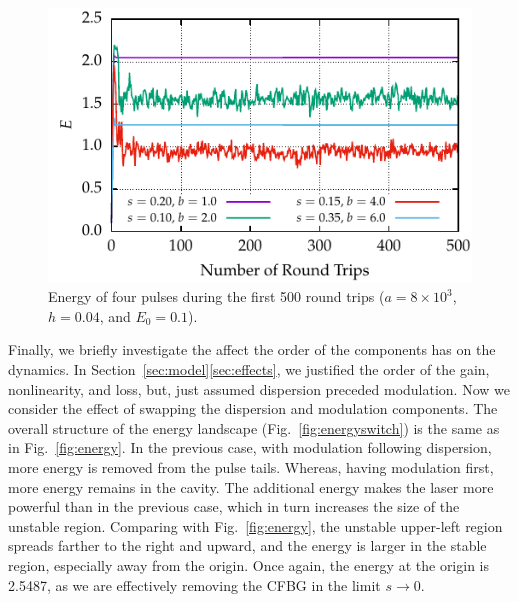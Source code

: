\documentclass[9pt,twocolumn,twoside]{osajnl}
\begin{document}
\begin{figure}[tbp]
	\centering
	\includegraphics{Figures/EnergyTime}
	\caption{Energy of four pulses during the first 500 round trips ($a = 8 \times 10^3$, $h = 0.04$, and $E_0 = 0.1$).}
	\label{fig:energytime}
\end{figure}

Finally, we briefly investigate the affect the order of the components has on the dynamics. In Section~\ref{sec:model}\ref{sec:effects}, we justified the order of the gain, nonlinearity, and loss, but, just assumed dispersion preceded modulation. Now we consider the effect of swapping the dispersion and modulation components. The overall structure of the energy landscape (Fig.~\ref{fig:energyswitch}) is the same as in Fig.~\ref{fig:energy}. In the previous case, with modulation following dispersion, more energy is removed from the pulse tails. Whereas, having modulation first, more energy remains in the cavity. The additional energy makes the laser more powerful than in the previous case, which in turn increases the size of the unstable region. Comparing with Fig.~\ref{fig:energy}, the unstable upper-left region spreads farther to the right and upward, and the energy is larger in the stable region, especially away from the origin. Once again, the energy at the origin is 2.5487, as we are effectively removing the CFBG in the limit $s \rightarrow 0$.
\end{document}
